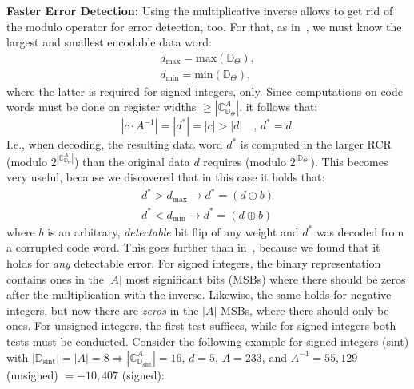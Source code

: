 \textbf{Faster Error Detection:}
Using the multiplicative inverse allows to get rid of the modulo operator for error detection, too. For that, as in~\cite{DBLP:conf/hase/HoffmannUDSLS14}, we must know the largest and smallest encodable data word:
\begin{align*}
d_\text{max} = \text{max}(\mathbb{D}_\Theta), \\
d_\text{min} = \text{min}(\mathbb{D}_\Theta),
\end{align*}
where the latter is required for signed integers, only. Since computations on code words must be done on register widths \(\geq|\mathbb{C}_{\mathbb{D}_\Theta}^A|\), it follows that:
\begin{equation}
|c \cdot A^{-1}| = |d^{*}| = |c| > |d| \quad \text{, }d^{*}=d.
\label{eq:decodewidth}
\end{equation}
I.e., when decoding, the resulting data word \(d^{*}\) is computed in the larger RCR (modulo \(2^{|\mathbb{C}_{\mathbb{D}_\Theta}^A|}\)) than the original data \(d\) requires (modulo \(2^{|\mathbb{D}_\Theta|}\)). This becomes very useful, because we discovered that in this case it holds that:
\begin{align}
d^* > d_\text{max} \rightarrow d^* = (d \oplus b) \label{eq:newvalidate:max} \\
d^* < d_\text{min} \rightarrow d^* = (d \oplus b) \label{eq:newvalidate:min}
\end{align}
where \(b\) is an arbitrary, \emph{detectable} bit flip of any weight and \(d^*\) was decoded from a corrupted code word. This goes further than in~\cite{DBLP:conf/hase/HoffmannUDSLS14}, because we found that it holds for \emph{any} detectable error. For signed integers, the binary representation contains ones in the \(|A|\) most significant bits (MSBs) where there should be zeros after the multiplication with the inverse. Likewise, the same holds for negative integers, but now there are \emph{zeros} in the \(|A|\) MSBs, where there should only be ones. For unsigned integers, the first test suffices, while for signed integers both tests must be conducted. Consider the following example for signed integers (sint) with \(|\mathbb{D}_\text{sint}|=|A|=8\Rightarrow|\mathbb{C}_{\mathbb{D}_\text{sint}}^A|=16\), \(d=5\), \(A=233\), and \(A^{-1}=55,129\) (unsigned) \(=-10,407\) (signed):

